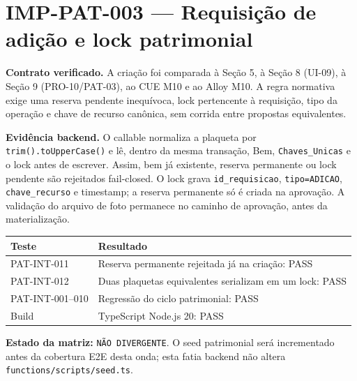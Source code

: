 \clearpage
\section{IMP-PAT-003 — Requisição de adição e lock patrimonial}

\textbf{Contrato verificado.} A criação foi comparada à Seção 5, à Seção 8
(UI-09), à Seção 9 (PRO-10/PAT-03), ao CUE M10 e ao Alloy M10. A regra
normativa exige uma reserva pendente inequívoca, lock pertencente à requisição,
tipo da operação e chave de recurso canônica, sem corrida entre propostas
equivalentes.

\textbf{Evidência backend.} O callable normaliza a plaqueta por
\texttt{trim().toUpperCase()} e lê, dentro da mesma transação, Bem,
\texttt{Chaves\_Unicas} e o lock antes de escrever. Assim, bem já existente,
reserva permanente ou lock pendente são rejeitados fail-closed. O lock grava
\texttt{id\_requisicao}, \texttt{tipo=ADICAO}, \texttt{chave\_recurso} e
timestamp; a reserva permanente só é criada na aprovação. A validação do
arquivo de foto permanece no caminho de aprovação, antes da materialização.

\begin{longtable}{p{}p{}}
\toprule
Teste & Resultado \\
\midrule
\endhead
PAT-INT-011 & Reserva permanente rejeitada já na criação: PASS \\
PAT-INT-012 & Duas plaquetas equivalentes serializam em um lock: PASS \\
PAT-INT-001--010 & Regressão do ciclo patrimonial: PASS \\
Build & TypeScript Node.js 20: PASS \\
\bottomrule
\end{longtable}

\textbf{Estado da matriz:} \texttt{NÃO DIVERGENTE}. O seed patrimonial será
incrementado antes da cobertura E2E desta onda; esta fatia backend não altera
\texttt{functions/scripts/seed.ts}.
